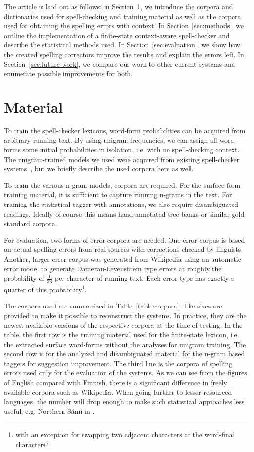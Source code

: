 \documentclass{llncs}
\begin{document}
The article is laid out as follows: in Section~\ref{sec:material}, we introduce
the corpora and dictionaries used for spell-checking and training material as
well as the corpora used for obtaining the spelling errors with context. In
Section~\ref{sec:methods}, we outline the implementation of a finite-state
context-aware spell-checker and describe the statistical methods used. In
Section~\ref{sec:evaluation}, we show how the created spelling correctors
improve the results and explain the errors left. In
Section~\ref{sec:future-work}, we compare our work to other current systems and
enumerate possible improvements for both.

\section{Material}
\label{sec:material}

To train the spell-checker lexicons, word-form probabilities can be acquired
from arbitrary running text. By using unigram frequencies, we can assign
all word-forms some initial probabilities in isolation, i.e. with no spell-checking context.
The unigram-trained models we used were acquired from existing 
spell-checker systems~\cite{norvig/2010,pirinen/2010/lrec}, but we briefly
describe the used corpora here as well.

To train the various n-gram models, corpora are required. For the surface-form
training material, it is sufficient to capture running n-grams in the text.
For training the statistical tagger with annotations, we also require 
disambiguated readings. Ideally of course this means hand-annotated
tree banks or similar gold standard corpora. 

For evaluation, two forms of error corpora are needed. One error corpus is based
on actual spelling errors from real sources with corrections
checked by linguists. Another, larger error corpus was generated from Wikipedia
using an automatic error model to generate Damerau-Levenshtein type errors at
roughly the probability of $\frac{1}{33}$ per character of running text. Each
error type has exactly a quarter of this probability\footnote{with an exception for
swapping two adjacent characters at the word-final character}. 

The corpora used are summarized in Table~\ref{table:corpora}. The sizes are
provided to make it possible to reconstruct the systems. In practice, they are the newest
available versions of the respective corpora at the time of testing. In the
table, the first row is the training material used for the finite-state
lexicon, i.e. the extracted surface word-forms without the analyses for unigram
training. The second row is for the analyzed and disambiguated material for the
n-gram based taggers for suggestion improvement. The third line is the corpora
of spelling errors used only for the evaluation of the systems.  As we can see
from the figures of English compared with Finnish, there is a significant
difference in freely available corpora such as Wikipedia. When going further to
lesser resourced languages, the number will drop enough to make such statistical
approaches less useful, e.g. Northern S\'{a}mi in \cite{pirinen/2010/lrec}.
\end{document}
